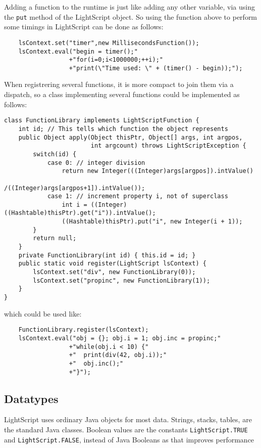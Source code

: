 \documentclass[11pt]{report}
\begin{document}
Adding a function to the runtime is just like adding any other variable,
via using the \verb|put| method of the LightScript object.
So using the function above to perform some timings in LightScript can be done as follows:
\begin{lstlisting}
    lsContext.set("timer",new MillisecondsFunction());
    lsContext.eval("begin = timer();"
                  +"for(i=0;i<1000000;++i);"
                  +"print(\"Time used: \" + (timer() - begin));");
\end{lstlisting}

When registrering several functions, it is more compact to join them via a dispatch, 
so a class implementing several functions could be implemented as follows:
\begin{lstlisting}
class FunctionLibrary implements LightScriptFunction {
    int id; // This tells which function the object represents
    public Object apply(Object thisPtr, Object[] args, int argpos, 
                        int argcount) throws LightScriptException {
        switch(id) {
            case 0: // integer division
                return new Integer(((Integer)args[argpos]).intValue()
                                  /((Integer)args[argpos+1]).intValue());
            case 1: // increment property i, not of superclass
                int i = ((Integer)((Hashtable)thisPtr).get("i")).intValue();
                ((Hashtable)thisPtr).put("i", new Integer(i + 1));
        }
        return null;
    }
    private FunctionLibrary(int id) { this.id = id; }
    public static void register(LightScript lsContext) {
        lsContext.set("div", new FunctionLibrary(0));
        lsContext.set("propinc", new FunctionLibrary(1));
    }
}
\end{lstlisting}
which could be used like:
\begin{lstlisting}
    FunctionLibrary.register(lsContext);
    lsContext.eval("obj = {}; obj.i = 1; obj.inc = propinc;"
                  +"while(obj.i < 10) {"
                  +"  print(div(42, obj.i));"
                  +"  obj.inc();"
                  +"}");
\end{lstlisting}

\subsection{Datatypes}
LightScript uses ordinary Java objects for most data.
Strings, stacks, tables, are the standard Java classes.
Boolean values are the constants \verb|LightScript.TRUE| and \verb|LightScript.FALSE|, instead of Java Booleans as that improves performance
\end{document}
